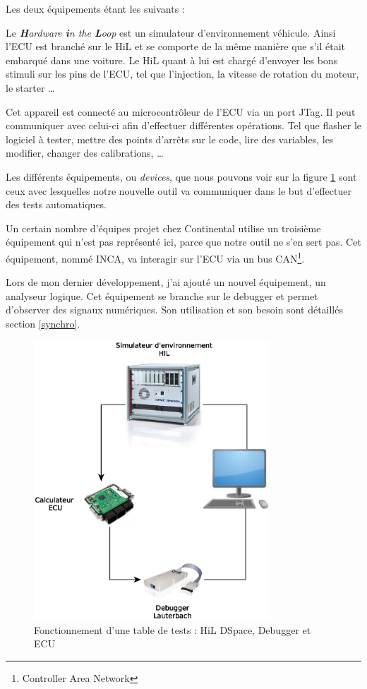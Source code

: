 Les deux équipements étant les suivants : 
\begin{description}
	\item[Le HiL] Le \textit{\textbf{H}ardware \textbf{i}n the \textbf{L}oop} est un simulateur d'environnement véhicule. Ainsi l'ECU est branché sur le HiL et se comporte de la même manière que s'il était embarqué dans une voiture. Le HiL quant à lui est chargé d'envoyer les bons stimuli sur les pins de l'ECU, tel que l'injection, la vitesse de rotation du moteur, le starter \ldots
	\item[Le Debugger] Cet {appareil} est connecté au microcontrôleur de l'ECU via un port JTag. Il peut communiquer avec celui-ci afin d'effectuer différentes opérations. Tel que flasher le logiciel à tester, mettre des points d'arrêts sur le code, lire des variables, les modifier, changer des calibrations, \ldots
\end{description}
Les différents équipements, ou \textit{devices}, que nous pouvons voir sur la figure \ref{fig:wb} sont ceux avec lesquelles notre nouvelle outil va communiquer dans le but d'effectuer des tests automatiques. 		

\begin{remarque}
	Un certain nombre d'équipes projet chez Continental utilise un troisième équipement qui n'est pas représenté ici, parce que notre outil ne s'en sert pas. Cet équipement, nommé INCA, va interagir sur l'ECU via un bus CAN\footnote{Controller Area Network}.
	
	Lors de mon dernier développement, j'ai ajouté un nouvel équipement, un analyseur logique. Cet équipement se branche sur le debugger et permet d'observer des signaux numériques. Son utilisation et son besoin sont détaillés section \ref{synchro}.
\end{remarque}

\begin{figure}[H]
	\centering
	\includegraphics[width=8.8cm]{contents/images/WB.eps}
	\caption{Fonctionnement d'une table de tests : HiL DSpace, Debugger et ECU}
	\label{fig:wb}
\end{figure}

